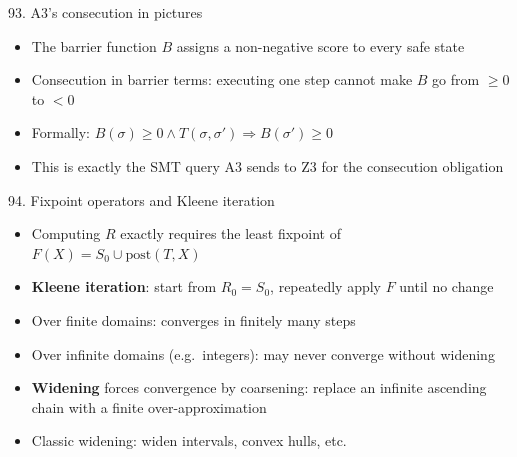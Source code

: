 \documentclass[aspectratio=169]{beamer}
\begin{document}
\begin{frame}{93. A3's consecution in pictures}
\begin{center}
\end{center}
\begin{itemize}
  \item The barrier function \(B\) assigns a non-negative score to every safe state
  \item Consecution in barrier terms: executing one step cannot make \(B\) go from $\ge0$ to $<0$
  \item Formally: \(B(\sigma) \ge 0 \wedge T(\sigma, \sigma') \Rightarrow B(\sigma') \ge 0\)
  \item This is exactly the SMT query A3 sends to Z3 for the consecution obligation
\end{itemize}
\end{frame}

\begin{frame}{94. Fixpoint operators and Kleene iteration}
\begin{itemize}
  \item Computing \(R\) exactly requires the least fixpoint of \(F(X) = S_0 \cup \text{post}(T, X)\)
  \item \textbf{Kleene iteration}: start from \(R_0 = S_0\), repeatedly apply \(F\) until no change
  \item Over finite domains: converges in finitely many steps
  \item Over infinite domains (e.g.\ integers): may never converge without widening
  \item \textbf{Widening} forces convergence by coarsening: replace an infinite ascending chain with a finite over-approximation
  \item Classic widening: widen intervals, convex hulls, etc.
\end{itemize}
\end{frame}
\end{document}

